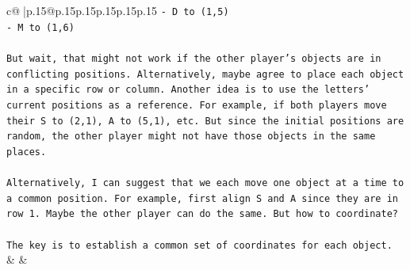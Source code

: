 \documentclass{article}
\begin{document}
{\begin{supertabular}{c@{$\;$}|p{.15\linewidth}@{}p{.15\linewidth}p{.15\linewidth}p{.15\linewidth}p{.15\linewidth}p{.15\linewidth}}
{{{\texttt{{-} D to (1,5)} \\
\texttt{{-} M to (1,6)} \\
\\ 
\texttt{But wait, that might not work if the other player's objects are in conflicting positions. Alternatively, maybe agree to place each object in a specific row or column. Another idea is to use the letters' current positions as a reference. For example, if both players move their S to (2,1), A to (5,1), etc. But since the initial positions are random, the other player might not have those objects in the same places.} \\
\\ 
\texttt{Alternatively, I can suggest that we each move one object at a time to a common position. For example, first align S and A since they are in row 1. Maybe the other player can do the same. But how to coordinate?} \\
\\ 
\texttt{The key is to establish a common set of coordinates for each object.} \\
            }
        }
    }
    & & \\ \\


\end{supertabular}}
\end{document}

